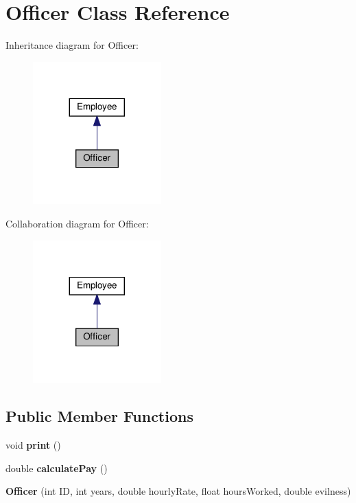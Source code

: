 \hypertarget{classOfficer}{}\section{Officer Class Reference}
\label{classOfficer}


Inheritance diagram for Officer\+:\nopagebreak
\begin{figure}[H]
\begin{center}
\leavevmode
\includegraphics[width=140pt]{classOfficer__inherit__graph}
\end{center}
\end{figure}


Collaboration diagram for Officer\+:\nopagebreak
\begin{figure}[H]
\begin{center}
\leavevmode
\includegraphics[width=140pt]{classOfficer__coll__graph}
\end{center}
\end{figure}
\subsection*{Public Member Functions}
\begin{DoxyCompactItemize}
\item 
\mbox{\label{classOfficer_aeadece05a1a0b7fb29bd412830d2e07a}} 
void {\bfseries print} ()
\item 
\mbox{\label{classOfficer_a1fa1aad39b9e95be7a088990ebf17059}} 
double {\bfseries calculate\+Pay} ()
\item 
\mbox{\label{classOfficer_ac75c45d6e8628606278cb4ce6596f67f}} 
{\bfseries Officer} (int ID, int years, double hourly\+Rate, float hours\+Worked, double evilness)
\end{DoxyCompactItemize}
